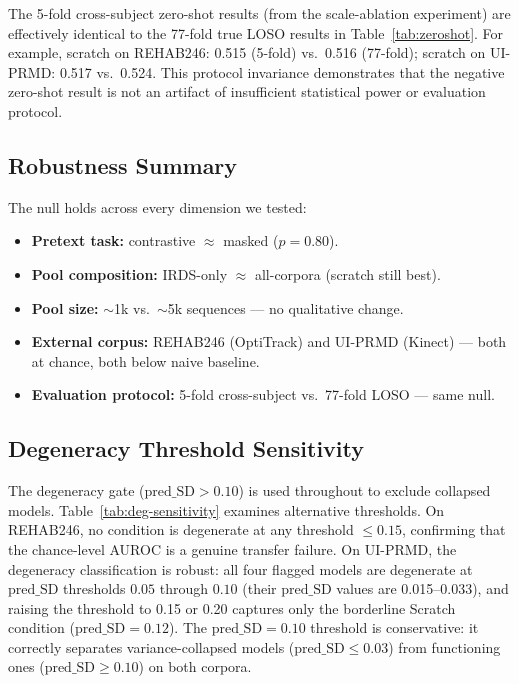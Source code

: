 \documentclass[10pt,journal]{IEEEtran}
\begin{document}
The 5-fold cross-subject zero-shot results (from the scale-ablation experiment) are effectively identical to the 77-fold true LOSO results in Table~\ref{tab:zeroshot}. For example, scratch on REHAB246: 0.515 (5-fold) vs.\ 0.516 (77-fold); scratch on UI-PRMD: 0.517 vs.\ 0.524. This protocol invariance demonstrates that the negative zero-shot result is not an artifact of insufficient statistical power or evaluation protocol.

\subsection{Robustness Summary}
\label{sec:robustness}

The null holds across every dimension we tested:
\begin{itemize}
    \item \textbf{Pretext task:} contrastive $\approx$ masked ($p = 0.80$).
    \item \textbf{Pool composition:} IRDS-only $\approx$ all-corpora (scratch still best).
    \item \textbf{Pool size:} $\sim$1k vs.\ $\sim$5k sequences --- no qualitative change.
    \item \textbf{External corpus:} REHAB246 (OptiTrack) and UI-PRMD (Kinect) --- both at chance, both below naive baseline.
    \item \textbf{Evaluation protocol:} 5-fold cross-subject vs.\ 77-fold LOSO --- same null.
\end{itemize}

\subsection{Degeneracy Threshold Sensitivity}
\label{sec:deg-sensitivity}

The degeneracy gate ($\text{pred\_SD} > 0.10$) is used throughout to exclude collapsed models. Table~\ref{tab:deg-sensitivity} examines alternative thresholds. On REHAB246, no condition is degenerate at any threshold $\leq 0.15$, confirming that the chance-level AUROC is a genuine transfer failure. On UI-PRMD, the degeneracy classification is robust: all four flagged models are degenerate at $\text{pred\_SD}$ thresholds $0.05$ through $0.10$ (their $\text{pred\_SD}$ values are 0.015--0.033), and raising the threshold to 0.15 or 0.20 captures only the borderline Scratch condition ($\text{pred\_SD}=0.12$). The $\text{pred\_SD}=0.10$ threshold is conservative: it correctly separates variance-collapsed models ($\text{pred\_SD} \leq 0.03$) from functioning ones ($\text{pred\_SD} \geq 0.10$) on both corpora.
\end{document}
